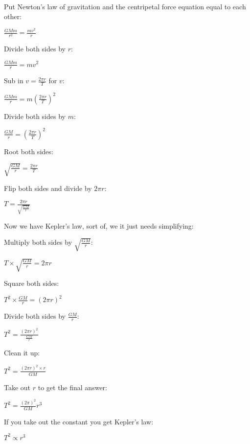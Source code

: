 \documentclass{article}
\begin{document}
Put Newton's law of gravitation and the centripetal force equation equal to each other:

$\frac{GMm}{r^2} = \frac{mv^2}{r}$

Divide both sides by $r$:

$\frac{GMm}{r} = mv^2$

Sub in $v = \frac{2 \pi r}{T}$ for $v$:

$\frac{GMm}{r} = m(\frac{2 \pi r}{T})^2$

Divide both sides by $m$:

$\frac{GM}{r} = (\frac{2 \pi r}{T})^2$

Root both sides:

$\sqrt{\frac{GM}{r}} = \frac{2 \pi r}{T}$

Flip both sides and divide by $2 \pi r$:

$T = \frac{2 \pi r}{\sqrt{\frac{GM}{r}}}$

Now we have Kepler's law, sort of, we it just needs simplifying:

Multiply both sides by $\sqrt{\frac{GM}{r}}$:

$T \times \sqrt{\frac{GM}{r}} = 2 \pi r$

Square both sides:

$T^2 \times \frac{GM}{r} = (2 \pi r)^2$

Divide both sides by $\frac{GM}{r}$:

$T^2 = \frac{(2 \pi r)^2}{\frac{GM}{r}}$

Clean it up:

$T^2 = \frac{(2 \pi r)^2 \times r}{GM}$

Take out $r$ to get the final answer:

$T^2 = \frac{(2 \pi)^2}{GM}r^3$

If you take out the constant you get Kepler's law:

$T^2 \propto r^3$
\end{document}
